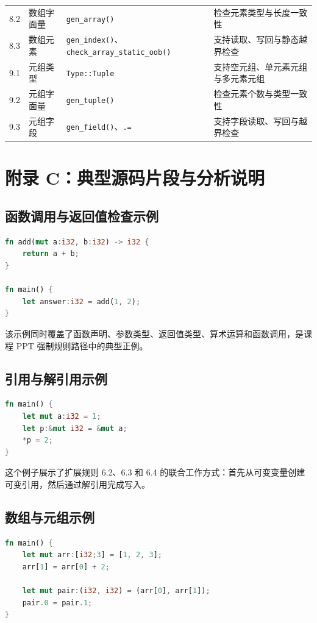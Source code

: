 \documentclass[UTF8,a4paper,12pt]{ctexart}
\newcommand{\pkg}[1]{\texttt{#1}}
\begin{document}
\begin{longtable}{P{1.6cm}P{4.1cm}P{4.5cm}P{3.6cm}}
    8.2 & 数组字面量 & \pkg{gen\_array()} & 检查元素类型与长度一致性 \\
    8.3 & 数组元素 & \pkg{gen\_index()}、\pkg{check\_array\_static\_oob()} & 支持读取、写回与静态越界检查 \\
    9.1 & 元组类型 & \pkg{Type::Tuple} & 支持空元组、单元素元组与多元素元组 \\
    9.2 & 元组字面量 & \pkg{gen\_tuple()} & 检查元素个数与类型一致性 \\
    9.3 & 元组字段 & \pkg{gen\_field()}、\pkg{.=} & 支持字段读取、写回与越界检查 \\
    \bottomrule
\end{longtable}

\section{附录 C：典型源码片段与分析说明}

\subsection{函数调用与返回值检查示例}

\begin{lstlisting}[language=Rust,caption={函数调用规则示例}]
fn add(mut a:i32, b:i32) -> i32 {
    return a + b;
}

fn main() {
    let answer:i32 = add(1, 2);
}
\end{lstlisting}

该示例同时覆盖了函数声明、参数类型、返回值类型、算术运算和函数调用，是课程 PPT 强制规则路径中的典型正例。

\subsection{引用与解引用示例}

\begin{lstlisting}[language=Rust,caption={引用、可变引用与解引用示例}]
fn main() {
    let mut a:i32 = 1;
    let p:&mut i32 = &mut a;
    *p = 2;
}
\end{lstlisting}

这个例子展示了扩展规则 6.2、6.3 和 6.4 的联合工作方式：首先从可变变量创建可变引用，然后通过解引用完成写入。

\subsection{数组与元组示例}

\begin{lstlisting}[language=Rust,caption={数组与元组组合示例}]
fn main() {
    let mut arr:[i32;3] = [1, 2, 3];
    arr[1] = arr[0] + 2;

    let mut pair:(i32, i32) = (arr[0], arr[1]);
    pair.0 = pair.1;
}
\end{lstlisting}
\end{document}
